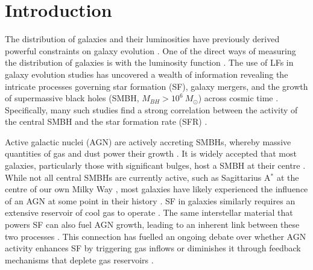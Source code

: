 \section{Introduction}
The distribution of galaxies and their luminosities have previously derived powerful constraints on galaxy evolution \citep{binggeli_luminosity_1988, benson_what_2003, rodighiero_mid-_2010, gruppioni_herschel_2013}. One of the direct ways of measuring the distribution of galaxies is with the luminosity function \citep{schechter_analytic_1976, saunders_60-mum_1990}. The use of LFs in galaxy evolution studies has uncovered a wealth of information revealing the intricate processes governing star formation (SF), galaxy mergers, and the growth of supermassive black holes (SMBH, $M_{BH} > 10^{6}\ M_{\odot}$) across cosmic time \citep{caputi_infrared_2007, hopkins_observational_2007, magnelli_deepest_2013, delvecchio_tracing_2014, hernan-caballero_resolving_2015}. Specifically, many such studies find a strong correlation between the activity of the central SMBH and the star formation rate (SFR) \citep{hopkins_cosmological_2008, merloni_synthesis_2008}. 

Active galactic nuclei (AGN) are actively accreting SMBHs, whereby massive quantities of gas and dust power their growth \citep{hopkins_cosmological_2008, han_evolution_2012, toba_9_2013, brown_infrared_2019}. It is widely accepted that most galaxies, particularly those with significant bulges, host a SMBH at their centre \citep{gruppioni_modelling_2011, han_evolution_2012, brown_infrared_2019}. While not all central SMBHs are currently active, such as Sagittarius A$^{*}$ at the centre of our own Milky Way \citep{event_horizon_telescope_collaboration_first_2022}, most galaxies have likely experienced the influence of an AGN at some point in their history \citep{gruppioni_modelling_2011}. SF in galaxies similarly requires an extensive reservoir of cool gas to operate \citep{schawinski_observational_2007, cicone_massive_2014}. The same interstellar material that powers SF can also fuel AGN growth, leading to an inherent link between these two processes \citep{hopkins_cosmological_2008, brown_infrared_2019}. This connection has fuelled an ongoing debate over whether AGN activity enhances SF by triggering gas inflows or diminishes it through feedback mechanisms that deplete gas reservoirs \citep{grazian_galaxy_2015, fiore_agn_2017}.

